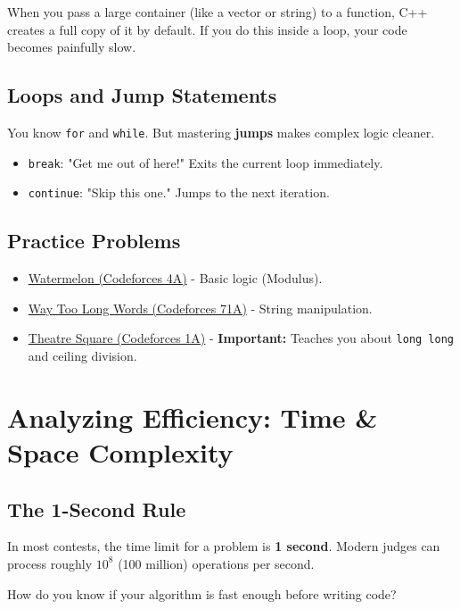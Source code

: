 \documentclass[12pt, a4paper]{report}
\begin{document}
When you pass a large container (like a vector or string) to a function, C++ creates a full copy of it by default. If you do this inside a loop, your code becomes painfully slow. \section{Loops and Jump Statements}
You know \texttt{for} and \texttt{while}. But mastering \textbf{jumps} makes complex logic cleaner.
\begin{itemize}
    \item \texttt{break}: "Get me out of here!" Exits the current loop immediately.
    \item \texttt{continue}: "Skip this one." Jumps to the next iteration.
\end{itemize}

\section{Practice Problems}
\begin{itemize}
    \item \href{https://codeforces.com/problemset/problem/4/A}{Watermelon (Codeforces 4A)} - Basic logic (Modulus).
    \item \href{https://codeforces.com/problemset/problem/71/A}{Way Too Long Words (Codeforces 71A)} - String manipulation.
    \item \href{https://codeforces.com/problemset/problem/1/A}{Theatre Square (Codeforces 1A)} - \textbf{Important:} Teaches you about \texttt{long long} and ceiling division.
\end{itemize}

\chapter{Analyzing Efficiency: Time \& Space Complexity}

\section{The 1-Second Rule}
In most contests, the time limit for a problem is \textbf{1 second}.
Modern judges can process roughly $10^8$ (100 million) operations per second.

\begin{thinkbox}
How do you know if your algorithm is fast enough before writing code?
\end{thinkbox}
\end{document}
